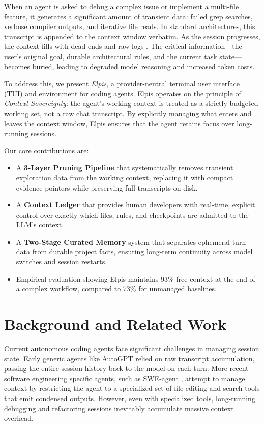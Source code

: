 \documentclass[conference]{IEEEtran}
\begin{document}
When an agent is asked to debug a complex issue or implement a multi-file feature, it generates a significant amount of transient data: failed grep searches, verbose compiler outputs, and iterative file reads. In standard architectures, this transcript is appended to the context window verbatim. As the session progresses, the context fills with dead ends and raw logs \cite{liu2024lost}. The critical information---the user's original goal, durable architectural rules, and the current task state---becomes buried, leading to degraded model reasoning and increased token costs.

To address this, we present \textit{Elpis}, a provider-neutral terminal user interface (TUI) and environment for coding agents. Elpis operates on the principle of \textit{Context Sovereignty}: the agent's working context is treated as a strictly budgeted working set, not a raw chat transcript. By explicitly managing what enters and leaves the context window, Elpis ensures that the agent retains focus over long-running sessions.

Our core contributions are:
\begin{itemize}
    \item A \textbf{3-Layer Pruning Pipeline} that systematically removes transient exploration data from the working context, replacing it with compact evidence pointers while preserving full transcripts on disk.
    \item A \textbf{Context Ledger} that provides human developers with real-time, explicit control over exactly which files, rules, and checkpoints are admitted to the LLM's context.
    \item A \textbf{Two-Stage Curated Memory} system that separates ephemeral turn data from durable project facts, ensuring long-term continuity across model switches and session restarts.
    \item Empirical evaluation showing Elpis maintains 93\% free context at the end of a complex workflow, compared to 73\% for unmanaged baselines.
\end{itemize}

\section{Background and Related Work}
Current autonomous coding agents face significant challenges in managing session state. Early generic agents like AutoGPT \cite{autogpt2023} relied on raw transcript accumulation, passing the entire session history back to the model on each turn. More recent software engineering specific agents, such as SWE-agent \cite{yang2024swe}, attempt to manage context by restricting the agent to a specialized set of file-editing and search tools that emit condensed outputs. However, even with specialized tools, long-running debugging and refactoring sessions inevitably accumulate massive context overhead.
\end{document}
